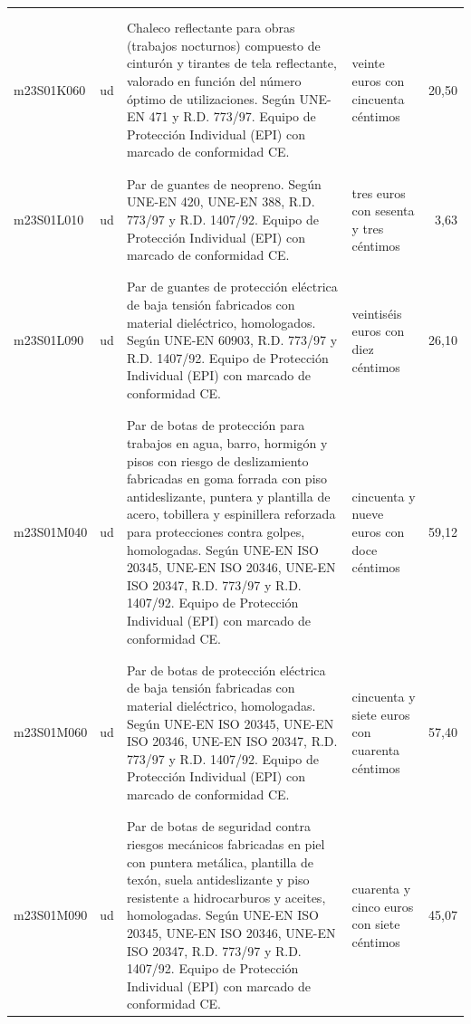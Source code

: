 \begin{supertabular}{|l|l|p{5cm}|p{3cm}|r|}
&&&&\\%
&&&&\\%
m23S01K060&ud&Chaleco reflectante para obras (trabajos nocturnos) compuesto de cinturón y tirantes de tela reflectante, valorado en función del número óptimo de utilizaciones. Según UNE{-}EN 471 y R.D. 773/97. Equipo de Protección Individual (EPI) con marcado de conformidad CE.&veinte euros con cincuenta céntimos&20,50\\%
&&&&\\%
&&&&\\%
m23S01L010&ud&Par de guantes de neopreno. Según UNE{-}EN 420, UNE{-}EN 388, R.D. 773/97 y R.D. 1407/92. Equipo de Protección Individual (EPI) con marcado de conformidad CE.&tres euros con sesenta y tres céntimos&3,63\\%
&&&&\\%
&&&&\\%
m23S01L090&ud&Par de guantes de protección eléctrica de baja tensión fabricados con material dieléctrico, homologados. Según UNE{-}EN 60903, R.D. 773/97 y R.D. 1407/92. Equipo de Protección Individual (EPI) con marcado de conformidad CE.&veintiséis euros con diez céntimos&26,10\\%
&&&&\\%
&&&&\\%
m23S01M040&ud&Par de botas de protección para trabajos en agua, barro, hormigón y pisos con riesgo de deslizamiento fabricadas en goma forrada con piso antideslizante, puntera y plantilla de acero, tobillera y espinillera reforzada para protecciones contra golpes, homologadas. Según UNE{-}EN ISO 20345, UNE{-}EN ISO 20346, UNE{-}EN ISO 20347, R.D. 773/97 y R.D. 1407/92. Equipo de Protección Individual (EPI) con marcado de conformidad CE.&cincuenta y nueve euros con doce céntimos&59,12\\%
&&&&\\%
&&&&\\%
m23S01M060&ud&Par de botas de protección eléctrica de baja tensión fabricadas con material dieléctrico, homologadas. Según UNE{-}EN ISO 20345, UNE{-}EN ISO 20346, UNE{-}EN ISO 20347, R.D. 773/97 y R.D. 1407/92. Equipo de Protección Individual (EPI) con marcado de conformidad CE.&cincuenta y siete euros con cuarenta céntimos&57,40\\%
&&&&\\%
&&&&\\%
m23S01M090&ud&Par de botas de seguridad contra riesgos mecánicos fabricadas en piel con puntera metálica, plantilla de texón, suela antideslizante y piso resistente a hidrocarburos y aceites, homologadas. Según UNE{-}EN ISO 20345, UNE{-}EN ISO 20346, UNE{-}EN ISO 20347, R.D. 773/97 y R.D. 1407/92. Equipo de Protección Individual (EPI) con marcado de conformidad CE.&cuarenta y cinco euros con siete céntimos&45,07\\%

\end{supertabular}
